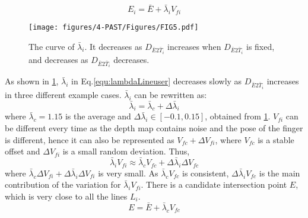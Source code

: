 \begin{equation} \label{equ:P_eye2}
E_i = {\bar E} + \bar\lambda_i V_{fi}  
\end{equation}
\begin{figure} 
	\centering
	\texttt{[image: figures/4-PAST/Figures/FIG5.pdf]}
	\caption{The curve of $\bar \lambda_i$. It decreases as $D_{\bar E2 \bar T_i}$ increases when $D_{\bar E2 \bar T_i}$ is fixed, and decreases as $D_{\bar E2 \bar T_i}$ decreases.}
	\label{fig:lambdai}
\end{figure}
As shown in \figurename{ \ref{fig:lambdai}}, $\bar \lambda_i$ in Eq.\ref{equ:lambdaLineuser} decreases slowly as $D_{\bar E2 \bar T_i}$ increases in three different example cases. $\bar\lambda_i$ can be rewritten as:
\begin{equation} \label{equ:lambdai}
\bar\lambda_i = \bar\lambda_c + \Delta \bar\lambda_i
\end{equation}
where $\bar\lambda_c = 1.15$ is the average and $\Delta \bar\lambda_i \in \left[-0.1,0.15\right] $, obtained from \figurename{ \ref{fig:lambdai}}. 
$V_{fi}$ can be different every time as the depth map contains noise and the pose of the finger is different, hence it can also be represented as $V_{fc} + {\Delta V_{fi}}$, where $V_{fc}$ is a stable offset and ${\Delta V_{fi}}$ is a small random deviation. Thus,
\begin{equation} \label{equ:lambdavf}
\bar\lambda_i V_{fi} \approx  \bar\lambda_c V_{fc}  + {\Delta \bar\lambda_i} {\Delta V_{fc}} %
\end{equation}
where $\bar\lambda_c {\Delta V_{fi}} + {\Delta \bar\lambda_i} {\Delta V_{fi}}$ is very small. As $\bar\lambda_c V_{fc}$ is consistent, $\Delta \bar\lambda_{i} V_{fc}$ is the main contribution of the variation for $\bar\lambda_i V_{fi}$. There is a candidate intersection point $E$, which is very close to all the lines $L_i$.
\begin{equation} \label{equ:P_eyeCalib}
E = {\bar E} + \bar\lambda_c V_{fc} 
\end{equation} 
